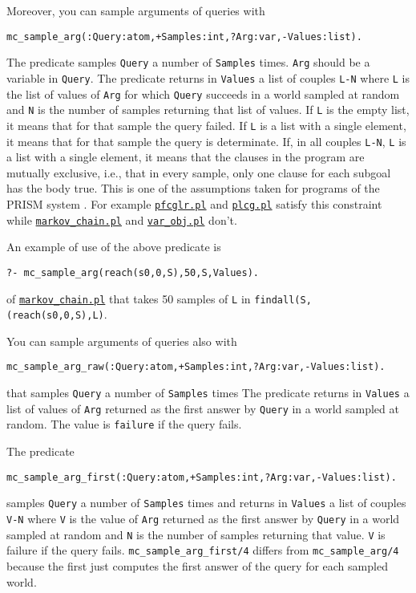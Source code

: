 Moreover, you can sample arguments of queries with
\begin{verbatim}
mc_sample_arg(:Query:atom,+Samples:int,?Arg:var,-Values:list).
\end{verbatim}
The predicate samples \verb|Query| a number of \verb|Samples| times. 
\verb|Arg| should be a variable in \verb|Query|.
The predicate returns in \verb|Values| a list of couples \verb|L-N| where
\verb|L| is the list of values of \verb|Arg| for which \verb|Query|
succeeds in a world sampled at random and \verb|N|
is the number of samples returning that list of values.
If \verb|L| is the empty list, it means that for that
sample the query failed. 
If \verb|L| is a list with a 
single element, it means that for that sample the query is 
determinate. 
If, in all couples \verb|L-N|, \verb|L| 
is a list with a 
single element, it means that the clauses in the program 
are mutually exclusive, i.e., that in every sample, only
one clause for each subgoal has the body true. This is one
of the assumptions taken for programs of the PRISM system \cite{DBLP:journals/jair/SatoK01}.
For example
\href{http://cplint.lamping.unife.it/example/inference/pfcglr.pl}{\texttt{pfcglr.pl}} and \href{http://cplint.lamping.unife.it/example/inference/plcg.pl}{\texttt{plcg.pl}} satisfy this constraint while
 \href{http://cplint.lamping.unife.it/example/inference/markov_chain.pl}{\texttt{markov\_chain.pl}} and \href{http://cplint.lamping.unife.it/example/inference/var_obj.pl}{\texttt{var\_obj.pl}} don't.


An example of use of the above predicate is
\begin{verbatim}
?- mc_sample_arg(reach(s0,0,S),50,S,Values). 
\end{verbatim}
of \href{http://cplint.lamping.unife.it/example/inference/markov_chain.pl}{\texttt{markov\_chain.pl}}
that takes 50 samples of \verb|L| in \verb|findall(S,(reach(s0,0,S),L)|.

You can sample arguments of queries also with
\begin{verbatim}
mc_sample_arg_raw(:Query:atom,+Samples:int,?Arg:var,-Values:list).
\end{verbatim}
that samples \verb|Query| a number of \verb|Samples| times 
The predicate returns in \verb|Values| a list of values
of \verb|Arg|  returned as the first answer by \verb|Query|  in
a world sampled at random.
The value is \verb|failure| if the query fails.

The predicate
\begin{verbatim}
mc_sample_arg_first(:Query:atom,+Samples:int,?Arg:var,-Values:list).
\end{verbatim}
samples \verb|Query| a number of \verb|Samples| times 
and returns in \verb|Values| a list of couples \verb|V-N| where 
\verb|V| is the value of \verb|Arg| returned as the first answer by \verb|Query| in 
a world sampled at random and \verb|N| is the number of samples
returning that value.
\verb|V| is failure if the query fails.
\verb|mc_sample_arg_first/4| differs from \verb|mc_sample_arg/4| because the first just computes the first
answer of the query for each sampled world.


